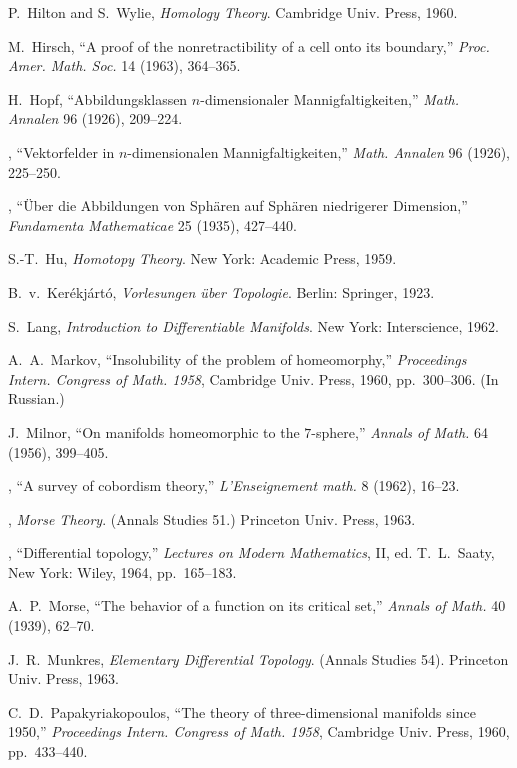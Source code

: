 \noindent [11] P.~Hilton and S.~Wylie, \emph{Homology Theory}. Cambridge Univ. Press, 1960.




\noindent [12] M.~Hirsch, ``A proof of the nonretractibility of a cell onto its boundary,'' \emph{Proc. Amer. Math. Soc.} 14 (1963), 364--365.

\noindent [13] H.~Hopf, ``Abbildungsklassen $n$-dimensionaler Mannigfaltigkeiten,'' \emph{Math. Annalen} 96 (1926), 209--224.

\noindent [14] \textemdash, ``Vektorfelder in $n$-dimensionalen Mannigfaltigkeiten,'' \emph{Math. Annalen} 96 (1926), 225--250.

\noindent [15] \textemdash, ``\"Uber die Abbildungen von Sph\"aren auf Sph\"aren niedrigerer Dimension,'' \emph{Fundamenta Mathematicae} 25 (1935), 427--440.

\noindent [16] S.-T.~Hu, \emph{Homotopy Theory}. New York: Academic Press, 1959.

\noindent [17] B.~v.~Ker\'ekj\'art\'o, \emph{Vorlesungen \"uber Topologie}. Berlin: Springer, 1923.

\noindent [18] S.~Lang, \emph{Introduction to Differentiable Manifolds}. New York: Interscience, 1962.

\noindent [19] A.~A.~Markov, ``Insolubility of the problem of homeomorphy,'' \emph{Proceedings Intern. Congress of Math. 1958}, Cambridge Univ. Press, 1960, pp.~300--306. (In Russian.)

\noindent [20] J.~Milnor, ``On manifolds homeomorphic to the $7$-sphere,'' \emph{Annals of Math.} 64 (1956), 399--405.

\noindent [21] \textemdash, ``A survey of cobordism theory,'' \emph{L'Enseignement math.} 8 (1962), 16--23.

\noindent [22] \textemdash, \emph{Morse Theory}. (Annals Studies 51.) Princeton Univ. Press, 1963.

\noindent [23] \textemdash, ``Differential topology,'' \emph{Lectures on Modern Mathematics}, II, ed. T.~L.~Saaty, New York: Wiley, 1964, pp.~165--183.

\noindent [24] A.~P.~Morse, ``The behavior of a function on its critical set,'' \emph{Annals of Math.} 40 (1939), 62--70.

\noindent [25] J.~R.~Munkres, \emph{Elementary Differential Topology}. (Annals Studies 54). Princeton Univ. Press, 1963.

\noindent [26] C.~D.~Papakyriakopoulos, ``The theory of three-dimensional manifolds since 1950,'' \emph{Proceedings Intern. Congress of Math. 1958}, Cambridge Univ. Press, 1960, pp.~433--440.

